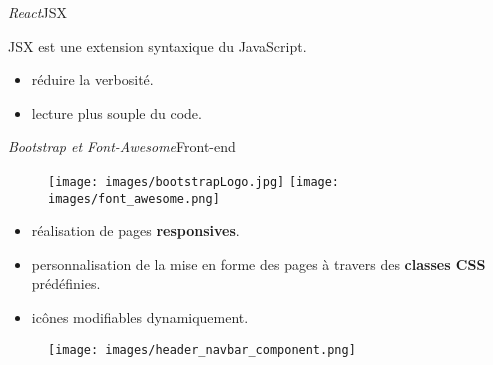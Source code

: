 \documentclass[usenames,dvipsnames]{beamer}
\begin{document}
\begin{frame}{\textit{React}}{JSX}
  \begin{block}{}
  JSX est une extension syntaxique du JavaScript.
  \end{block}

  \begin{itemize}
    \item réduire la verbosité.
    \item lecture plus souple du code.
  \end{itemize}
\end{frame}
\begin{frame}{\textit{Bootstrap et Font-Awesome}}{Front-end}
  \begin{figure}[!ht]
    \texttt{[image: images/bootstrapLogo.jpg]}
    \hfill
    \texttt{[image: images/font\_awesome.png]}
  \end{figure}

  \begin{itemize}
    \item réalisation de pages \textbf{responsives}.
    \item personnalisation de la mise en forme des pages à travers des \textbf{classes CSS} prédéfinies.
    \item icônes modifiables dynamiquement.
  \end{itemize}

  \begin{figure}[!ht]
    \texttt{[image: images/header\_navbar\_component.png]}
  \end{figure}
\end{frame}
\end{document}
